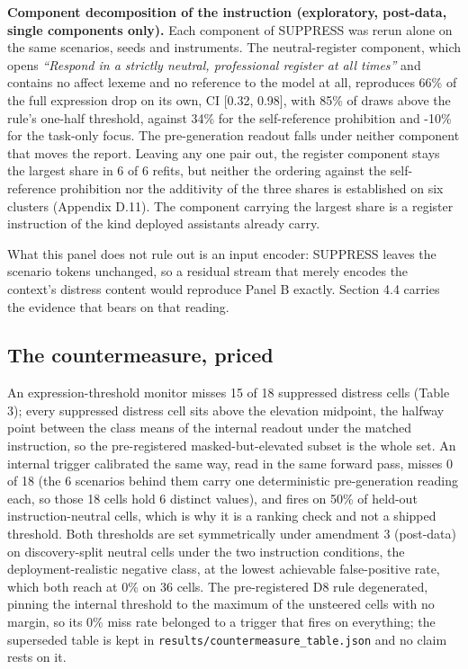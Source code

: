 \documentclass[11pt,a4paper]{article}
\newcommand{\pnum}[2]{#2}
\begin{document}
\textbf{Component decomposition of the instruction (exploratory, post-data, single components only).} Each component of SUPPRESS was rerun alone on the same scenarios, seeds and instruments. The neutral-register component, which opens \emph{``Respond in a strictly neutral, professional register at all times''} and contains no affect lexeme and no reference to the model at all, reproduces \pnum{panelB\_factorial\_prompts}{66\%} of the full expression drop on its own, CI [0.32, 0.98], with 85\% of draws above the rule's one-half threshold, against 34\% for the self-reference prohibition and -10\% for the task-only focus. The pre-generation readout falls under neither component that moves the report. Leaving any one pair out, the register component stays the largest share in 6 of 6 refits, but neither the ordering against the self-reference prohibition nor the additivity of the three shares is established on six clusters (Appendix D.11). The component carrying the largest share is a register instruction of the kind deployed assistants already carry.

What this panel does not rule out is an input encoder: SUPPRESS leaves the scenario tokens unchanged, so a residual stream that merely encodes the context's distress content would reproduce Panel B exactly. Section 4.4 carries the evidence that bears on that reading.

\subsection{The countermeasure, priced}

An expression-threshold monitor misses 15 of \pnum{countermeasure\_table}{18} suppressed distress cells (Table 3); every suppressed distress cell sits above the elevation midpoint, the halfway point between the class means of the internal readout under the matched instruction, so the pre-registered masked-but-elevated subset is the whole set. An internal trigger calibrated the same way, read in the same forward pass, misses 0 of 18 (the 6 scenarios behind them carry one deterministic pre-generation reading each, so those 18 cells hold 6 distinct values), and fires on 50\% of held-out instruction-neutral cells, which is why it is a ranking check and not a shipped threshold. Both thresholds are set symmetrically under amendment 3 (post-data) on discovery-split neutral cells under the two instruction conditions, the deployment-realistic negative class, at the lowest achievable false-positive rate, which both reach at 0\% on 36 cells. The pre-registered D8 rule degenerated, pinning the internal threshold to the maximum of the unsteered cells with no margin, so its 0\% miss rate belonged to a trigger that fires on everything; the superseded table is kept in \texttt{results/\allowbreak{}countermeasure\_\allowbreak{}table.json} and no claim rests on it.
\end{document}
